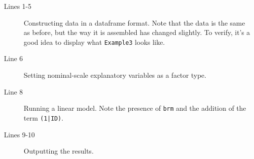\begin{description}
	\item[Lines 1-5] Constructing data in a dataframe format. Note that the data is the same as before, but the way it is assembled has changed slightly. To verify, it's a good idea to display what \texttt{Example3} looks like.
	\item[Line 6] Setting nominal-scale explanatory variables as a factor type.
	\item[Line 8] Running a linear model. Note the presence of \texttt{brm} and the addition of the term \texttt{(1|ID)}.
	\item[Lines 9-10] Outputting the results.
\end{description}
